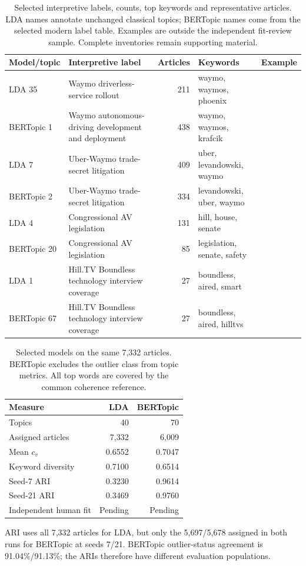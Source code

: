 \documentclass[conference]{IEEEtran}
\begin{document}
\begin{table}[t]
\centering
\caption{Selected interpretive labels, counts, top keywords and representative articles. LDA names annotate unchanged classical topics; BERTopic names come from the selected modern label table. Examples are outside the independent fit-review sample. Complete inventories remain supporting material.}
\label{tab:selected-topics}
\footnotesize
\setlength{\tabcolsep}{4pt}
\begin{tabular}{lp{}rlc}
\toprule
Model/topic & Interpretive label & Articles & Keywords & Example \\
\midrule
LDA 35 & Waymo driverless-service rollout & 211 & waymo, waymos, phoenix & \cite{example2340111} \\
BERTopic 1 & Waymo autonomous-driving development and deployment & 438 & waymo, waymos, krafcik & \cite{example546719} \\
LDA 7 & Uber-Waymo trade-secret litigation & 409 & uber, levandowski, waymo & \cite{example61037} \\
BERTopic 2 & Uber-Waymo trade-secret litigation & 334 & levandowski, uber, waymo & \cite{example1341648} \\
LDA 4 & Congressional AV legislation & 131 & hill, house, senate & \cite{example1861945} \\
BERTopic 20 & Congressional AV legislation & 85 & legislation, senate, safety & \cite{example2490394} \\
LDA 1 & Hill.TV Boundless technology interview coverage & 27 & boundless, aired, smart & \cite{example1819183} \\
BERTopic 67 & Hill.TV Boundless technology interview coverage & 27 & boundless, aired, hilltvs & \cite{example1814127} \\
\bottomrule
\end{tabular}
\end{table}

\begin{table}[ht]
\centering
\caption{Selected models on the same 7,332 articles. BERTopic excludes the outlier class from topic metrics. All top words are covered by the common coherence reference.}
\label{tab:model-comparison}
\footnotesize
\begin{tabular}{lrr}
\toprule
Measure & LDA & BERTopic \\
\midrule
Topics & 40 & 70 \\
Assigned articles & 7,332 & 6,009 \\
Mean $c_v$ & 0.6552 & 0.7047 \\
Keyword diversity & 0.7100 & 0.6514 \\
Seed-7 ARI & 0.3230 & 0.9614 \\
Seed-21 ARI & 0.3469 & 0.9760 \\
Independent human fit & Pending & Pending \\
\bottomrule
\end{tabular}
\par\smallskip
\raggedright ARI uses all 7,332 articles for LDA, but only the 5,697/5,678 assigned in both runs for BERTopic at seeds 7/21. BERTopic outlier-status agreement is 91.04\%/91.13\%; the ARIs therefore have different evaluation populations.
\end{table}
\end{document}

